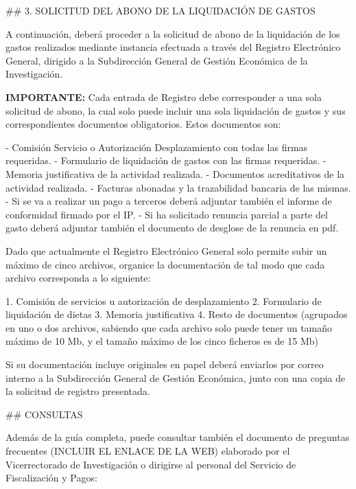 \documentclass{article}
\begin{document}
\begin{itemize}
\begin{itemize}
\begin{scriptsize}
                  \#\# 3. SOLICITUD DEL ABONO DE LA LIQUIDACIÓN DE GASTOS

                  A continuación, deberá proceder a la solicitud de abono de la liquidación de los gastos realizados mediante instancia efectuada a través del Registro Electrónico General, dirigido a la Subdirección General de Gestión Económica de la Investigación.

                  \textbf{IMPORTANTE:} Cada entrada de Registro debe corresponder a una sola solicitud de abono, la cual solo puede incluir una sola liquidación de gastos y sus correspondientes documentos obligatorios. Estos documentos son:

                  - Comisión Servicio o Autorización Desplazamiento con todas las firmas requeridas.
                  - Formulario de liquidación de gastos con las firmas requeridas.
                  - Memoria justificativa de la actividad realizada.
                  - Documentos acreditativos de la actividad realizada.
                  - Facturas abonadas y la trazabilidad bancaria de las mismas.
                  - Si se va a realizar un pago a terceros deberá adjuntar también el informe de conformidad firmado por el IP.
                  - Si ha solicitado renuncia parcial a parte del gasto deberá adjuntar también el documento de desglose de la renuncia en pdf.

                  Dado que actualmente el Registro Electrónico General solo permite subir un máximo de cinco archivos, organice la documentación de tal modo que cada archivo corresponda a lo siguiente:

                  1. Comisión de servicios u autorización de desplazamiento
                  2. Formulario de liquidación de dietas
                  3. Memoria justificativa
                  4. Resto de documentos (agrupados en uno o dos archivos, sabiendo que cada archivo solo puede tener un tamaño máximo de 10 Mb, y el tamaño máximo de los cinco ficheros es de 15 Mb)

                  Si su documentación incluye originales en papel deberá enviarlos por correo interno a la Subdirección General de Gestión Económica, junto con una copia de la solicitud de registro presentada.

                  \#\# CONSULTAS

                  Además de la guía completa, puede consultar también el documento de preguntas frecuentes (INCLUIR EL ENLACE DE LA WEB) elaborado por el Vicerrectorado de Investigación o dirigirse al personal del Servicio de Fiscalización y Pagos:


\end{scriptsize}
\end{itemize}
\end{itemize}
\end{document}

